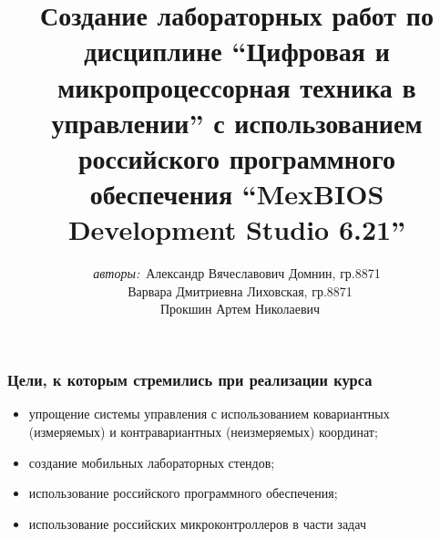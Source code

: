 \newcommand{\itemi}{\item[\checkmark]}


\title{\small{ Создание лабораторных работ по дисциплине \enquote{Цифровая и микропроцессорная техника в управлении} с использованием российского программного обеспечения
\enquote{MexBIOS Development Studio 6.21}}}
\author{\small{%
\emph{авторы:}~Александр Вячеславович Домнин, гр.8871\\%
\emph{}~Варвара Дмитриевна Лиховская, гр.8871\\
\emph{}~Прокшин Артем Николаевич}}



\vspace{30pt}%

\vspace{60pt}%

\AdvanceDate[-4] %


\begin{frame}
\titlepage	
\end{frame}

\begin{frame}
\frametitle{\small Цели, к которым стремились при реализации курса} 
\begin{itemize}
	\item упрощение системы управления с использованием ковариантных (измеряемых) и контравариантных (неизмеряемых) координат;
\item создание мобильных лабораторных стендов; %
\item использование российского программного обеспечения;
\item использование российских микроконтроллеров в части задач 
\end{itemize}
\end{frame}


